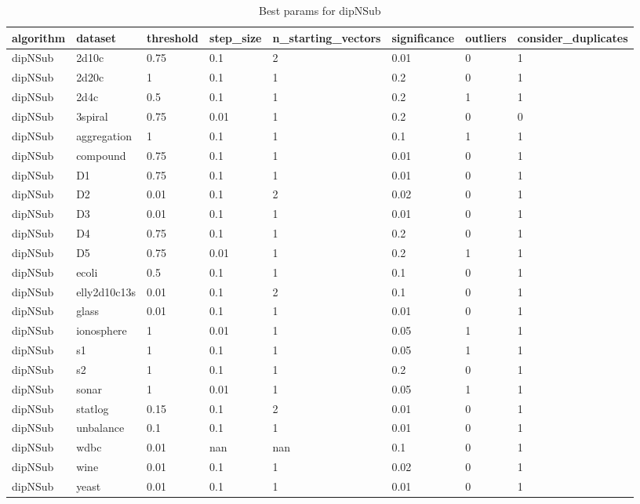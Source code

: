 \clearpage

\begin{table}[H]
\centering
\caption{Best params for dipNSub}
\label{S20_Table}
\begin{tabular}{|l|l|l|l|l|l|l|l|}
\hline
algorithm & dataset & threshold & step\_size & n\_starting\_vectors & significance & outliers & consider\_duplicates \\
\hline
dipNSub & 2d10c & 0.75 & 0.1 & 2 & 0.01 & 0 & 1 \\
\hline
dipNSub & 2d20c & 1 & 0.1 & 1 & 0.2 & 0 & 1 \\
\hline
dipNSub & 2d4c & 0.5 & 0.1 & 1 & 0.2 & 1 & 1 \\
\hline
dipNSub & 3spiral & 0.75 & 0.01 & 1 & 0.2 & 0 & 0 \\
\hline
dipNSub & aggregation & 1 & 0.1 & 1 & 0.1 & 1 & 1 \\
\hline
dipNSub & compound & 0.75 & 0.1 & 1 & 0.01 & 0 & 1 \\
\hline
dipNSub & D1 & 0.75 & 0.1 & 1 & 0.01 & 0 & 1 \\
\hline
dipNSub & D2 & 0.01 & 0.1 & 2 & 0.02 & 0 & 1 \\
\hline
dipNSub & D3 & 0.01 & 0.1 & 1 & 0.01 & 0 & 1 \\
\hline
dipNSub & D4 & 0.75 & 0.1 & 1 & 0.2 & 0 & 1 \\
\hline
dipNSub & D5 & 0.75 & 0.01 & 1 & 0.2 & 1 & 1 \\
\hline
dipNSub & ecoli & 0.5 & 0.1 & 1 & 0.1 & 0 & 1 \\
\hline
dipNSub & elly2d10c13s & 0.01 & 0.1 & 2 & 0.1 & 0 & 1 \\
\hline
dipNSub & glass & 0.01 & 0.1 & 1 & 0.01 & 0 & 1 \\
\hline
dipNSub & ionosphere & 1 & 0.01 & 1 & 0.05 & 1 & 1 \\
\hline
dipNSub & s1 & 1 & 0.1 & 1 & 0.05 & 1 & 1 \\
\hline
dipNSub & s2 & 1 & 0.1 & 1 & 0.2 & 0 & 1 \\
\hline
dipNSub & sonar & 1 & 0.01 & 1 & 0.05 & 1 & 1 \\
\hline
dipNSub & statlog & 0.15 & 0.1 & 2 & 0.01 & 0 & 1 \\
\hline
dipNSub & unbalance & 0.1 & 0.1 & 1 & 0.01 & 0 & 1 \\
\hline
dipNSub & wdbc & 0.01 & nan & nan & 0.1 & 0 & 1 \\
\hline
dipNSub & wine & 0.01 & 0.1 & 1 & 0.02 & 0 & 1 \\
\hline
dipNSub & yeast & 0.01 & 0.1 & 1 & 0.01 & 0 & 1 \\
\hline
\end{tabular}
\end{table}

